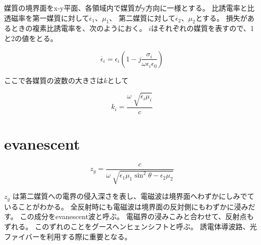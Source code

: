 \documentclass[a4paper,11pt]{jsarticle}
\begin{document}
媒質の境界面をx-y平面、各領域内で媒質がy方向に一様とする。
比誘電率と比透磁率を第一媒質に対して$\dot{\epsilon_1}$、$\mu_1$、
第二媒質に対して$\dot{\epsilon_2}$、$\mu_2$とする。
損失があるときの複素比誘電率を、次のようにおく。
$i$はそれぞれの媒質を表すので、1と2の値をとる。

\begin{equation}
  \dot{\epsilon_i} = \epsilon_i(1 - j\frac{\sigma_i}{\omega\epsilon_i\epsilon_0})
\end{equation}

ここで各媒質の波数の大きさは$k$として

\begin{equation}
  k_i = \frac{\omega\sqrt[]{\dot{\epsilon_i}\mu_i}}{c}
\end{equation}

\section{evanescent}

\begin{equation}
  z_g = \frac{c}{\omega\sqrt[]{\epsilon_1\mu_1\sin^{2}\theta - \epsilon_2\mu_2}}
\end{equation}

$z_g$ は第二媒質への電界の侵入深さを表し、電磁波は境界面へわずかにしみでていることがわかる。
全反射時にも電磁波は境界面の反対側にもわずかに浸みだす。
この成分をevanescent波と呼ぶ。
電磁界の浸みこみと合わせて、反射点もずれる。
このずれのことをグースヘンヒェンシフトと呼ぶ。
誘電体導波路、光ファイバーを利用する際に重要となる。　
\end{document}
